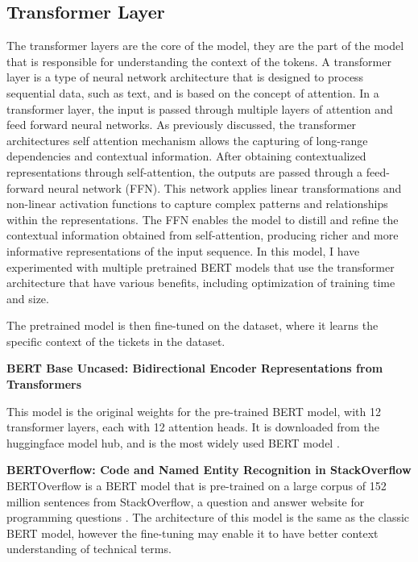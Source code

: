\documentclass{UoYCSproject}
\begin{document}
    \subsection[transformer-layer]{Transformer Layer}
    The transformer layers are the core of the model, they are the part of the model that is responsible for understanding the context of the tokens.
    A transformer layer is a type of neural network architecture that is designed to process sequential data, such as text, and is based on the concept of attention.
    In a transformer layer, the input is passed through multiple layers of attention and feed forward neural networks.
    As previously discussed, the transformer architectures self attention mechanism allows the capturing of long-range dependencies and contextual information.
    After obtaining contextualized representations through self-attention, the outputs are passed through a feed-forward neural network (FFN).
    This network applies linear transformations and non-linear activation functions to capture complex patterns and relationships within the representations.
    The FFN enables the model to distill and refine the contextual information obtained from self-attention, producing richer and more informative representations of the input sequence.
    In this model, I have experimented with multiple pretrained BERT models that use the transformer architecture that have various benefits, including optimization of training time and size. \par
    The pretrained model is then fine-tuned on the dataset, where it learns the specific context of the tickets in the dataset.

    \par

    \textbf{BERT Base Uncased: Bidirectional Encoder Representations from Transformers}

    This model is the original weights for the pre-trained BERT model, with 12 transformer layers, each with 12 attention heads.
    It is downloaded from the huggingface model hub, and is the most widely used BERT model \cite{bert-base-uncased}.
    \par

    \textbf{BERTOverflow: Code and Named Entity Recognition in StackOverflow}
    BERTOverflow is a BERT model that is pre-trained on a large corpus of 152 million sentences from StackOverflow, a question and answer website for programming questions \cite{tabassum2020code}.
    The architecture of this model is the same as the classic BERT model, however the fine-tuning may enable it to have better context understanding of technical terms.
    \par
\end{document}
